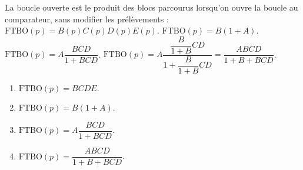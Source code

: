 \begin{corrigebox}
La boucle ouverte est le produit des blocs parcourus lorsqu'on ouvre
        la boucle au comparateur, sans modifier les prélèvements :
        $\boxed{\mathrm{FTBO}(p)=B(p)C(p)D(p)E(p)}$.
$\text{FTBO}(p) = B\left(1+A\right)$.
$\text{FTBO}(p) = A \dfrac{BCD}{1+BCD}$.
$\text{FTBO}(p) = A \dfrac{\dfrac{B}{1+B}CD}{1+\dfrac{B}{1+B}CD} = \dfrac{ABCD}{1+B+BCD}$.

\begin{enumerate}
\item $\text{FTBO}(p) = BCDE$.
\item $\text{FTBO}(p) = B\left(1+A\right)$.
\item $\text{FTBO}(p) = A \dfrac{BCD}{1+BCD}$.
\item $\text{FTBO}(p) = \dfrac{ABCD}{1+B+BCD}$.
\end{enumerate}
\end{corrigebox}
